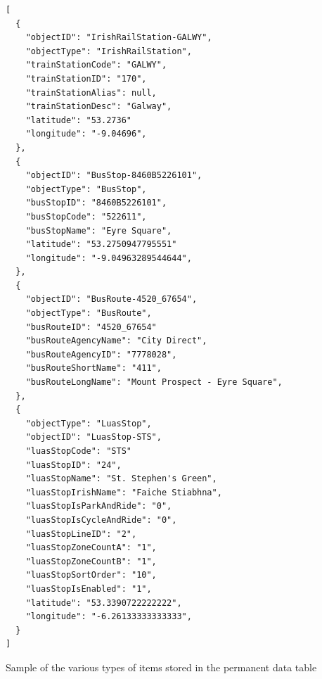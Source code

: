 \documentclass[a4paper,11pt]{report}
\newenvironment{code}{\captionsetup{type=listing}}{}
\begin{document}
\begin{code}
\begin{verbatim}
[
  {
    "objectID": "IrishRailStation-GALWY",
    "objectType": "IrishRailStation",
    "trainStationCode": "GALWY",
    "trainStationID": "170",
    "trainStationAlias": null,
    "trainStationDesc": "Galway",
    "latitude": "53.2736"
    "longitude": "-9.04696",
  },
  {
    "objectID": "BusStop-8460B5226101",
    "objectType": "BusStop",
    "busStopID": "8460B5226101",
    "busStopCode": "522611",
    "busStopName": "Eyre Square",
    "latitude": "53.2750947795551"
    "longitude": "-9.04963289544644",
  },
  {
    "objectID": "BusRoute-4520_67654",
    "objectType": "BusRoute",
    "busRouteID": "4520_67654"
    "busRouteAgencyName": "City Direct",
    "busRouteAgencyID": "7778028",
    "busRouteShortName": "411",
    "busRouteLongName": "Mount Prospect - Eyre Square",
  },
  {
    "objectType": "LuasStop",
    "objectID": "LuasStop-STS",
    "luasStopCode": "STS"
    "luasStopID": "24",
    "luasStopName": "St. Stephen's Green",
    "luasStopIrishName": "Faiche Stiabhna",
    "luasStopIsParkAndRide": "0",
    "luasStopIsCycleAndRide": "0",
    "luasStopLineID": "2",
    "luasStopZoneCountA": "1",
    "luasStopZoneCountB": "1",
    "luasStopSortOrder": "10",
    "luasStopIsEnabled": "1",
    "latitude": "53.3390722222222",
    "longitude": "-6.26133333333333",
  }
]
\end{verbatim}
\caption{Sample of the various types of items stored in the permanent data table}
\label{listing:permanent_data}
\end{code}
\end{document}
